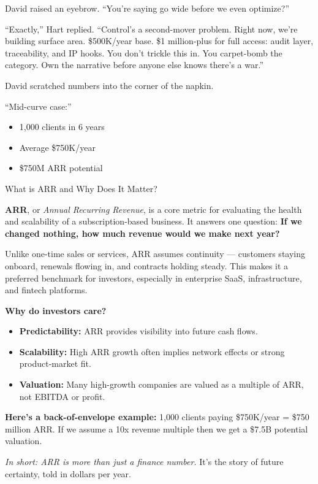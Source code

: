David raised an eyebrow. ``You’re saying go wide before we even optimize?''

``Exactly,'' Hart replied. ``Control’s a second-mover problem.  
Right now, we’re building surface area. \$500K/year base. \$1 million-plus for full access: audit layer, 
traceability, and IP hooks.  
You don’t trickle this in. You carpet-bomb the category. Own the narrative before anyone else knows 
there’s a war.''

David scratched numbers into the corner of the napkin.

``Mid-curve case:''

\begin{itemize}
  \item 1{,}000 clients in 6 years  
  \item Average \$750K/year  
  \item \$750M ARR potential
\end{itemize}


\medskip

\begin{TechnicalSidebar}{What is ARR and Why Does It Matter?}

  \textbf{ARR}, or \textit{Annual Recurring Revenue}, is a core metric for evaluating the health and scalability of 
  a subscription-based business.  
  It answers one question: \textbf{If we changed nothing, how much revenue would we make next year?}
  
  \medskip
  
  Unlike one-time sales or services, ARR assumes continuity — customers staying onboard, renewals flowing in, and 
  contracts holding steady.  
  This makes it a preferred benchmark for investors, especially in enterprise SaaS, infrastructure, and 
  fintech platforms.
  
  \medskip
  
  \textbf{Why do investors care?}

  \medskip
  
  \begin{itemize}
    \item \textbf{Predictability:} ARR provides visibility into future cash flows.
    \item \textbf{Scalability:} High ARR growth often implies network effects or strong product-market fit.
    \item \textbf{Valuation:} Many high-growth companies are valued as a multiple of ARR, not EBITDA or profit.
  \end{itemize}
  
  \medskip
  
  \textbf{Here's a back-of-envelope example:}  
  1,000 clients paying \$750K/year = \$750 million ARR.  
  If we assume a 10x revenue multiple then we get a \$7.5B potential valuation.
  
  \medskip
  
  \textit{In short: ARR is more than just a finance number.}  
  It’s the story of future certainty, told in dollars per year.
  
\end{TechnicalSidebar}


